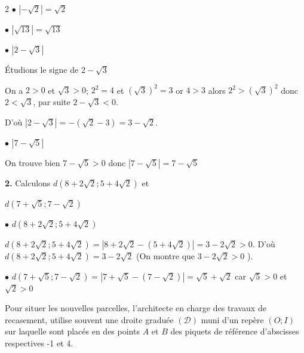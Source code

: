 \begin{multicols}{2}
  	$\bullet$  $ \left|-\sqrt{2} \right |=\sqrt{2}$
  	
  	$\bullet$  $ \left|\sqrt{13} \right |=\sqrt{13}$
  	
  	$\bullet$  $ \left|2-\sqrt{3} \right |$
  	
  	Étudions le signe de $ 2-\sqrt{3}$ 
  	
  	On a $2>0$ et $\sqrt{3}>0$; $2^2=4$ et $\left(\sqrt{3}\right)^2=3$ or $4>3$  alors $2^2>\left(\sqrt{3}\right)^2$ donc $2<\sqrt{3}$, par suite $2-\sqrt{3}<0$. 
  	
  	D'où   $ \left|2-\sqrt{3} \right |= -\left(\sqrt{2}-3\right)=3-\sqrt{2}$.
  	
  	$\bullet$  $ \left|7-\sqrt{5} \right |$
  	
  	On trouve bien $7-\sqrt{5}>0$ donc $ \left|7-\sqrt{5} \right |=7-\sqrt{5}$
  	
  	\textbf{2.} Calculons $d \left( 8+2\sqrt{2}; 5+4\sqrt{2} \right) $ et 
  	
  	$d \left(7+\sqrt{5}; 7-\sqrt{2} \right)$
  	
  	$\bullet$ $d\left( 8+2\sqrt{2}; 5+4\sqrt{2} \right)$
  	
  	$d\left( 8+2\sqrt{2}; 5+4\sqrt{2} \right)= \left|8+2\sqrt{2}-(5+4\sqrt{2}) \right |= 3-2\sqrt{2}>0$. D'où $d\left( 8+2\sqrt{2}; 5+4\sqrt{2} \right)=3-2\sqrt{2}$ (On montre que $ 3-2\sqrt{2}>0 $ ).
  	
  	$\bullet$ $d \left(7+\sqrt{5}; 7-\sqrt{2} \right)=\left|7+\sqrt{5}-(7-\sqrt{2}) \right |=\sqrt{5}+\sqrt{2}$ car $\sqrt{5}>0$ et $\sqrt{2}>0$
  	\\
  	
  	
  	
  	\hspace{0.3cm} Pour situer les nouvelles parcelles, l'architecte en charge des travaux de recasement, utilise souvent une droite graduée  $\mathcal{(D)}$ muni d'un repère $\left(O; I \right)$ sur laquelle sont placés en des points $A$ et $B$ des piquets de référence d'abscisses respectives -1 et 4.  
  	

\end{multicols}
